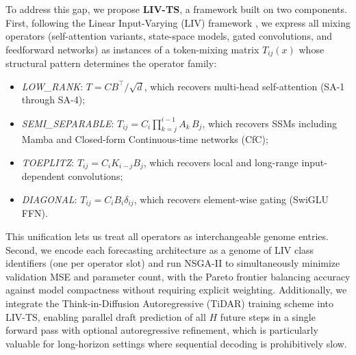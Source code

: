To address this gap, we propose \textbf{LIV-TS}, a framework built on two components.
First, following the Linear Input-Varying (LIV) framework \cite{thomas2024star,massaroli2024liv}, we express all mixing operators (self-attention variants, state-space models, gated convolutions, and feedforward networks) as instances of a token-mixing matrix $T_{ij}(x)$ whose structural pattern determines the operator family:
\begin{itemize}
  \item \emph{LOW\_RANK}: $T = CB^\top / \sqrt{d}$, which recovers multi-head self-attention (SA-1 through SA-4);
  \item \emph{SEMI\_SEPARABLE}: $T_{ij} = C_i\!\prod_{k=j}^{i-1}\!A_k\,B_j$, which recovers SSMs including Mamba and Closed-form Continuous-time networks (CfC);
  \item \emph{TOEPLITZ}: $T_{ij} = C_i K_{i-j} B_j$, which recovers local and long-range input-dependent convolutions;
  \item \emph{DIAGONAL}: $T_{ij} = C_i B_i \delta_{ij}$, which recovers element-wise gating (SwiGLU FFN).
\end{itemize}
This unification lets us treat all operators as interchangeable genome entries.
Second, we encode each forecasting architecture as a genome of LIV class identifiers (one per operator slot) and run NSGA-II \cite{deb2002nsga2} to simultaneously minimize validation MSE and parameter count, with the Pareto frontier balancing accuracy against model compactness without requiring explicit weighting.
Additionally, we integrate the Think-in-Diffusion Autoregressive (TiDAR) training scheme \cite{tidar2024} into LIV-TS, enabling parallel draft prediction of all $H$ future steps in a single forward pass with optional autoregressive refinement, which is particularly valuable for long-horizon settings where sequential decoding is prohibitively slow.

